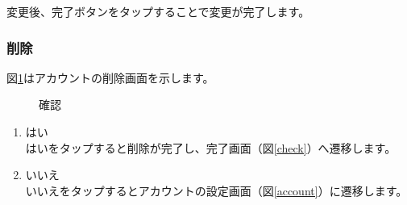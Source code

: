 \documentclass[a4j]{jarticle}
\begin{document}
変更後、完了ボタンをタップすることで変更が完了します。

\newpage
\subsubsection{削除}
図\ref{delete}はアカウントの削除画面を示します。\\

\begin{figure}[H]
    \begin{center}
    \caption {確認}
    \label{delete}
    \end{center}
\end{figure}

\begin{enumerate}
  \renewcommand{\labelenumi}{\textcircled{\scriptsize \theenumi}}
\item はい\\
  はいをタップすると削除が完了し、完了画面（図\ref{check}）へ遷移します。
\item いいえ\\
  いいえをタップするとアカウントの設定画面（図\ref{account}）に遷移します。
\end{enumerate}
\end{document}
